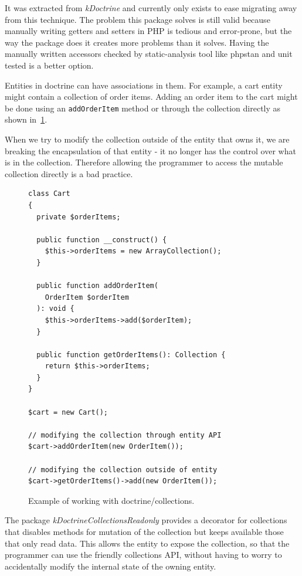 It was extracted from \textit{\gls{kDoctrine}} and currently only exists to ease migrating away from this technique. The problem this package solves is still valid because manually writing getters and setters in PHP is tedious and error-prone, but the way the package does it creates more problems than it solves. Having the manually written accessors checked by static-analysis tool like \gls{phpstan} and unit tested is a better option.

 \label{sec:state:doctrine-collections-readonly}

Entities in \gls{doctrine} can have associations in them. For example, a cart entity might contain a collection of order items. Adding an order item to the cart might be done using an \lstinline{addOrderItem} method or through the collection directly as shown in~\ref{fig:collections-readonly:example}.

When we try to modify the collection outside of the entity that owns it, we are breaking the encapsulation of that entity - it no longer has the control over what is in the collection. Therefore allowing the programmer to access the mutable collection directly is a bad practice.

\begin{figure} \label{fig:collections-readonly:example}
\begin{lstlisting}
class Cart
{
  private $orderItems;

  public function __construct() {
    $this->orderItems = new ArrayCollection();
  }

  public function addOrderItem(
    OrderItem $orderItem
  ): void {
    $this->orderItems->add($orderItem);
  }

  public function getOrderItems(): Collection {
    return $this->orderItems;
  }
}

$cart = new Cart();

// modifying the collection through entity API
$cart->addOrderItem(new OrderItem());

// modifying the collection outside of entity
$cart->getOrderItems()->add(new OrderItem());
\end{lstlisting}
\caption{Example of working with doctrine/collections.}
\end{figure}

The package \textit{\gls{kDoctrineCollectionsReadonly}} provides a decorator for collections that disables methods for mutation of the collection but keeps available those that only read data. This allows the entity to expose the collection, so that the programmer can use the friendly collections API, without having to worry to accidentally modify the internal state of the owning entity.

